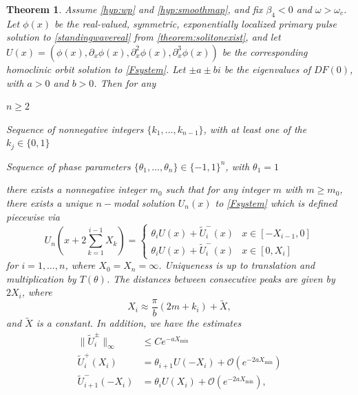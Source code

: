 \documentclass[12pt]{elsarticle}
\newtheorem{theorem}{Theorem}
\begin{document}
\begin{theorem}\label{theorem:multiexist}
Assume \cref{hyp:wp} and \cref{hyp:smoothmap}, and fix $\beta_4 < 0$ and $\omega > \omega_c$. Let $\phi(x)$ be the real-valued, symmetric, exponentially localized primary pulse solution to \cref{standingwavereal} from \cref{theorem:solitonexist}, and let $U(x) = (\phi(x), \partial_x \phi(x), \partial_x^2 \phi(x), \partial_x^3 \phi(x))$ be the corresponding homoclinic orbit solution to \cref{Fsystem}. Let $\pm a \pm bi$ be the eigenvalues of $DF(0)$, with $a > 0$ and $b > 0$. Then for any 
\begin{compactenum}[(i)]
\item $n \geq 2$
\item Sequence of nonnegative integers $\{ k_1, \dots, k_{n-1} \}$, with at least one of the $k_j \in \{0, 1 \}$
\item Sequence of phase parameters $\{ \theta_1, \dots, \theta_n \} \in \{-1, 1 \}^n$, with $\theta_1 = 1$
\end{compactenum}
there exists a nonnegative integer $m_0$ such that for any integer $m$ with $m \geq m_0$, there exists a unique $n-$modal solution $U_n(x)$ to \cref{Fsystem} which is defined piecewise via
\begin{equation}\label{Unpiecewise}
U_n\left( x + 2 \sum_{k=1}^{i-1} X_k \right) = \begin{cases} 
\theta_i U(x) + \tilde{U}_i^-(x) & x \in [-X_{i-1}, 0] \\
\theta_i U(x) + \tilde{U}_i^-(x) & x \in [0, X_i]
\end{cases}
\end{equation}
for $i = 1, \dots, n$, where $X_0 = X_n = \infty$. Uniqueness is up to translation and multiplication by $T(\theta)$. The distances between consecutive peaks are given by $2 X_i$, where
\begin{equation}\label{pulsedistances}
X_i \approx \frac{\pi}{b}(2 m + k_i) + \tilde{X},
\end{equation}
and $\tilde{X}$ is a constant. In addition, we have the estimates
\begin{equation}\label{Unestimates}
\begin{aligned}
\|\tilde{U}_i^\pm\|_\infty &\leq C e^{-a X_{\mathrm{min}}} \\
\tilde{U}_i^+(X_i) &= \theta_{i+1} U(-X_i) + \mathcal{O}(e^{-2 a X_{\min}}) \\
\tilde{U}_{i+1}^-(-X_i) &= \theta_i U(X_i) + \mathcal{O}(e^{-2 a X_{\min}}),
\end{aligned}
\end{equation}

\end{theorem}
\end{document}

